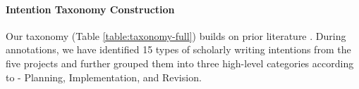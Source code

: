 

\paragraph{Intention Taxonomy Construction}
Our taxonomy (Table \ref{table:taxonomy-full}) builds on prior literature \cite{f508427a-e4c0-3d6a-8abf-03a5d21ec6c4,  du-etal-2022-understanding-iterative, koo2023decoding}. During annotations, we have identified 15 types of scholarly writing intentions from the five projects and further grouped them into three high-level categories according to \citet{f508427a-e4c0-3d6a-8abf-03a5d21ec6c4} - \colorbox{planningcolor}{Planning}, \colorbox{implementationcolor}{Implementation}, and \colorbox{revisioncolor}{Revision}. 






